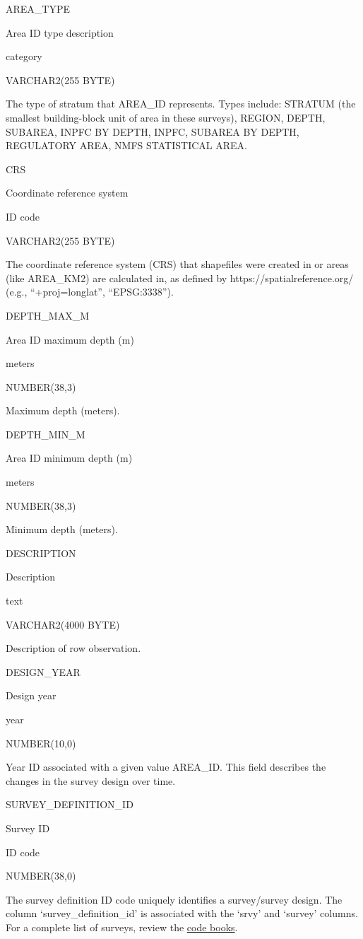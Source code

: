 \documentclass[
  letterpaper,
  oneside,
  open=any]{scrbook}
\begin{document}
AREA\_TYPE

Area ID type description

category

VARCHAR2(255 BYTE)

The type of stratum that AREA\_ID represents. Types include: STRATUM
(the smallest building-block unit of area in these surveys), REGION,
DEPTH, SUBAREA, INPFC BY DEPTH, INPFC, SUBAREA BY DEPTH, REGULATORY
AREA, NMFS STATISTICAL AREA.

CRS

Coordinate reference system

ID code

VARCHAR2(255 BYTE)

The coordinate reference system (CRS) that shapefiles were created in or
areas (like AREA\_KM2) are calculated in, as defined by
https://spatialreference.org/ (e.g., ``+proj=longlat'', ``EPSG:3338'').

DEPTH\_MAX\_M

Area ID maximum depth (m)

meters

NUMBER(38,3)

Maximum depth (meters).

DEPTH\_MIN\_M

Area ID minimum depth (m)

meters

NUMBER(38,3)

Minimum depth (meters).

DESCRIPTION

Description

text

VARCHAR2(4000 BYTE)

Description of row observation.

DESIGN\_YEAR

Design year

year

NUMBER(10,0)

Year ID associated with a given value AREA\_ID. This field describes the
changes in the survey design over time.

SURVEY\_DEFINITION\_ID

Survey ID

ID code

NUMBER(38,0)

The survey definition ID code uniquely identifies a survey/survey
design. The column `survey\_definition\_id' is associated with the
`srvy' and `survey' columns. For a complete list of surveys, review the
\href{https://www.fisheries.noaa.gov/resource/document/groundfish-survey-species-code-manual-and-data-codes-manual}{code
books}.
\end{document}
